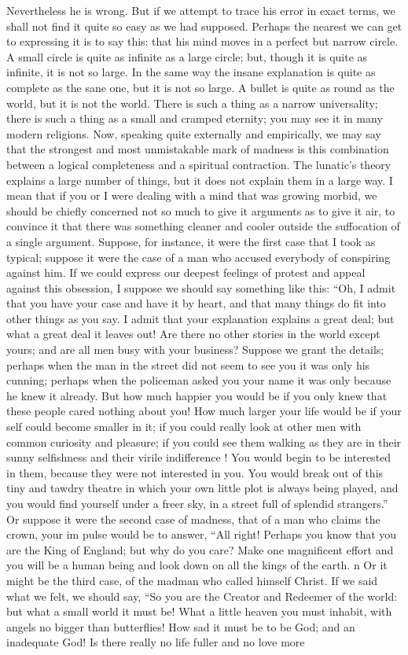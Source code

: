 \documentclass{book}
\begin{document}
Nevertheless he is wrong. But if we attempt to trace his error in exact terms, we shall not find it quite so easy as we had supposed. Perhaps the nearest we can get to expressing it is to say this: that his mind moves in a perfect but narrow circle. A small circle is quite as infinite as a large circle; but, though it is quite as infinite, it is not so large. In the same way the insane explanation is quite as complete as the sane one, but it is not so large. A bullet is quite as round as the world, but it is not the world. There is such a thing as a narrow universality; there is such a thing as a small and cramped eternity; you may see it in many modern religions. Now, speaking quite externally and empirically, we may say that the strongest and most unmistakable mark of madness is this combination between a logical completeness and a spiritual contraction. The lunatic’s theory explains a large number of things, but it does not explain them in a large way. I mean that if you or I were dealing with a mind that was growing morbid, we should be chiefly concerned not so much to give it arguments as to give it air, to convince it that there was something cleaner and cooler outside the suffocation of a single argument. Suppose, for instance, it were the first case that I took as typical; suppose it were the case of a man who accused everybody of conspiring against him. If we could express our deepest feelings of protest and appeal against this obsession, I suppose we should say something like this: “Oh, I admit that you have your case and have it by heart, and that many things do fit into other things as you say. I admit that your explanation explains a great deal; but what a great deal it leaves out! Are there no other stories in the world except yours; and are all men busy with your business? Suppose we grant the details; perhaps when the man in the street did not seem to see you it was only his cunning; perhaps when the policeman asked you your name it was only because he knew it already. But how much happier you would be if you only knew that these people cared nothing about you! How much larger your life would be if your self could become smaller in it; if you could really look at other men with common curiosity and pleasure; if you could see them walking as they are in their sunny selfishness and their virile indifference ! You would begin to be interested in them, because they were not interested in you. You would break out of this tiny and tawdry theatre in which your own little plot is always being played, and you would find yourself under a freer sky, in a street full of splendid strangers.” Or suppose it were the second case of madness, that of a man who claims the crown, your im pulse would be to answer, “All right! Perhaps you know that you are the King of England; but why do you care? Make one magnificent effort and you will be a human being and look down on all the kings of the earth. n Or it might be the third case, of the madman who called himself Christ. If we said what we felt, we should say, “So you are the Creator and Redeemer of the world: but what a small world it must be! What a little heaven you must inhabit, with angels no bigger than butterflies! How sad it must be to be God; and an inadequate God! Is there really no life fuller and no love more 
\end{document}
